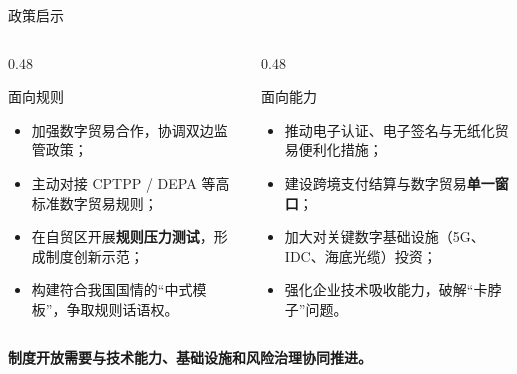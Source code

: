 \documentclass[aspectratio=169,10pt]{ctexbeamer}
\newcommand{\hl}[1]{\textcolor{XJTUBlue}{\textbf{#1}}}
\begin{document}
\begin{frame}{政策启示}
  \begin{columns}[T,totalwidth=\textwidth]
    \begin{column}{0.48\textwidth}
      \begin{block}{面向规则}
        \footnotesize
        \begin{itemize}
          \item 加强数字贸易合作，协调双边监管政策；
          \item 主动对接 \alert{CPTPP / DEPA} 等高标准数字贸易规则；
          \item 在自贸区开展\hl{规则压力测试}，形成制度创新示范；
          \item 构建符合我国国情的“中式模板”，争取规则话语权。
        \end{itemize}
      \end{block}
    \end{column}
    \begin{column}{0.48\textwidth}
      \begin{block}{面向能力}
        \footnotesize
        \begin{itemize}
          \item 推动电子认证、电子签名与无纸化贸易便利化措施；
          \item 建设跨境支付结算与数字贸易\hl{单一窗口}；
          \item 加大对关键数字基础设施（5G、IDC、海底光缆）投资；
          \item 强化企业\alert{技术吸收能力}，破解“卡脖子”问题。
        \end{itemize}
      \end{block}
    \end{column}
  \end{columns}
  \vspace{0.4em}
  \begin{center}
    \large \textcolor{XJTUBlue}{\textbf{制度开放需要与技术能力、基础设施和风险治理协同推进。}}
  \end{center}
\end{frame}
\end{document}
